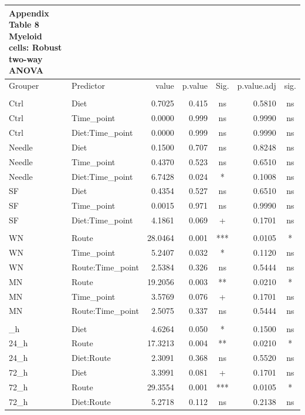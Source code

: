 \documentclass[
  12pt,
  letterpaper,
]{article}
\begin{document}
\begin{longtable}{l|lrrcrc}
\caption*{
{\large \textbf{Appendix Table 8}} \\ 
{\small \textbf{Myeloid cells: Robust two-way ANOVA}}
} \\ 
\toprule
\multicolumn{1}{l}{Grouper} & Predictor & value & p.value & Sig. & p.value.adj & sig. \\ 
\midrule\addlinespace[2.5pt]
\multicolumn{7}{l}{Grouped by Route} \\ 
\midrule\addlinespace[2.5pt]
Ctrl & Diet & 0.7025 & 0.415 & ns & 0.5810 & ns \\ 
Ctrl & Time\_point & 0.0000 & 0.999 & ns & 0.9990 & ns \\ 
Ctrl & Diet:Time\_point & 0.0000 & 0.999 & ns & 0.9990 & ns \\ 
Needle & Diet & 0.1500 & 0.707 & ns & 0.8248 & ns \\ 
Needle & Time\_point & 0.4370 & 0.523 & ns & 0.6510 & ns \\ 
Needle & Diet:Time\_point & 6.7428 & 0.024 & * & 0.1008 & ns \\ 
SF & Diet & 0.4354 & 0.527 & ns & 0.6510 & ns \\ 
SF & Time\_point & 0.0015 & 0.971 & ns & 0.9990 & ns \\ 
SF & Diet:Time\_point & 4.1861 & 0.069 & + & 0.1701 & ns \\ 
\midrule\addlinespace[2.5pt]
\multicolumn{7}{l}{Grouped by Diet} \\ 
\midrule\addlinespace[2.5pt]
WN & Route & 28.0464 & 0.001 & *** & 0.0105 & * \\ 
WN & Time\_point & 5.2407 & 0.032 & * & 0.1120 & ns \\ 
WN & Route:Time\_point & 2.5384 & 0.326 & ns & 0.5444 & ns \\ 
MN & Route & 19.2056 & 0.003 & ** & 0.0210 & * \\ 
MN & Time\_point & 3.5769 & 0.076 & + & 0.1701 & ns \\ 
MN & Route:Time\_point & 2.5075 & 0.337 & ns & 0.5444 & ns \\ 
\midrule\addlinespace[2.5pt]
\multicolumn{7}{l}{Grouped by Time\_point} \\ 
\midrule\addlinespace[2.5pt]
24\_h & Diet & 4.6264 & 0.050 & * & 0.1500 & ns \\ 
24\_h & Route & 17.3213 & 0.004 & ** & 0.0210 & * \\ 
24\_h & Diet:Route & 2.3091 & 0.368 & ns & 0.5520 & ns \\ 
72\_h & Diet & 3.3991 & 0.081 & + & 0.1701 & ns \\ 
72\_h & Route & 29.3554 & 0.001 & *** & 0.0105 & * \\ 
72\_h & Diet:Route & 5.2718 & 0.112 & ns & 0.2138 & ns \\ 
\bottomrule
\end{longtable}
\end{document}

